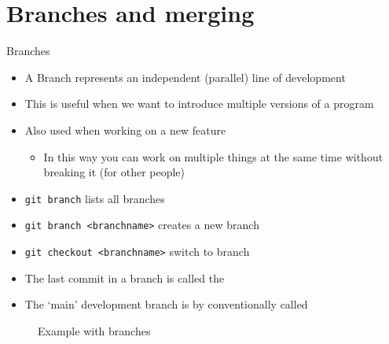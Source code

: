 \documentclass[12pt]{beamer}
\begin{document}
 \section{Branches and merging}

\begin{frame}[fragile]{Branches}
\begin{itemize}
\item A Branch represents an independent (parallel) line of development
\item This is useful when we want to introduce multiple versions of a program
\item Also used when working on a new feature
\begin{itemize}
\item In this way you can work on multiple things at the same time without breaking it (for other people)
\end{itemize}
\item \texttt{git branch} lists all branches
\item \texttt{git branch <branchname>} creates a new branch
\item \texttt{git checkout <branchname>} switch to branch
\item The last commit in a branch is called the \textbf{}
\item The `main' development branch is by conventionally called 
\end{itemize}

\end{frame}

\begin{frame}
	\begin{figure}
     \caption{Example with branches}
\end{figure}
\end{frame}
\end{document}
